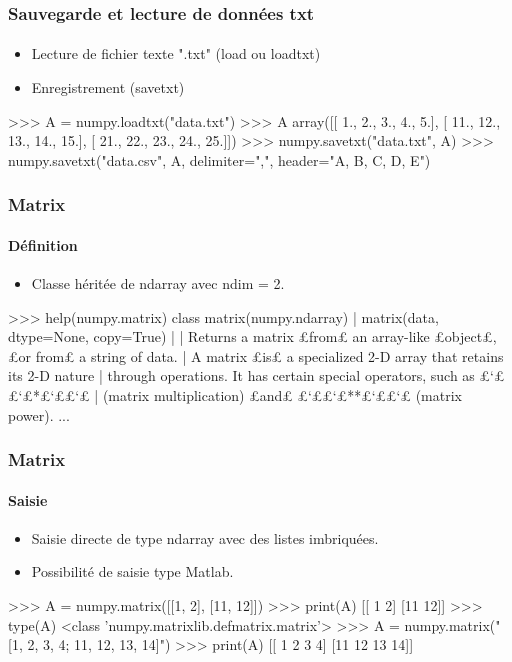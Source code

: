 \begin{frame}[fragile]
\frametitle{Sauvegarde et lecture de données txt}
\framesubtitle{}
\begin{itemize}
 \item Lecture de fichier texte ".txt" (load ou loadtxt) 
 \item Enregistrement (savetxt) 
\end{itemize}
\begin{pythonConsole}
>>> A = numpy.loadtxt("data.txt")
>>> A
array([[  1.,   2.,   3.,   4.,   5.],
       [ 11.,  12.,  13.,  14.,  15.],
       [ 21.,  22.,  23.,  24.,  25.]])
>>> numpy.savetxt("data.txt", A)
>>> numpy.savetxt("data.csv", A, delimiter=",", header="A, B, C, D, E")
\end{pythonConsole}
\end{frame}
\begin{frame}[fragile]
\frametitle{Matrix}
\framesubtitle{Définition}
\begin{itemize}
 \item Classe héritée de ndarray avec ndim = 2.  
\end{itemize}
\begin{pythonConsole}
>>> help(numpy.matrix)
class matrix(numpy.ndarray)         
 |  matrix(data, dtype=None, copy=True)
 |  
 |  Returns a matrix £from£ an array-like £object£, £or from£ a string of data.
 |  A matrix £is£ a specialized 2-D array that retains its 2-D nature
 |  through operations.  It has certain special operators, such as £`££`£*£`££`£
 |  (matrix multiplication) £and£ £`££`£**£`££`£ (matrix power).
...
\end{pythonConsole}
\end{frame}
\begin{frame}[fragile]
\frametitle{Matrix}
\framesubtitle{Saisie}
\begin{itemize}
 \item Saisie directe de type ndarray avec des listes imbriquées. 
 \item Possibilité de saisie type Matlab.
\end{itemize}
\begin{pythonConsole}
>>> A = numpy.matrix([[1, 2], [11, 12]])
>>> print(A)
[[ 1  2]
 [11 12]]
>>> type(A)
 <class 'numpy.matrixlib.defmatrix.matrix'>
>>> A = numpy.matrix("[1, 2, 3, 4; 11, 12, 13, 14]")
>>> print(A)
[[ 1  2  3  4]
 [11 12 13 14]]
\end{pythonConsole}
\end{frame}
